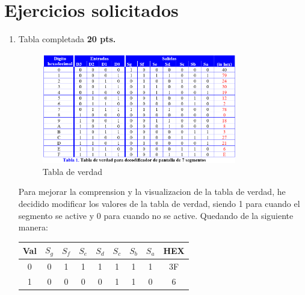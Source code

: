 \documentclass{templateNote}
\begin{document}

\portada
\margenes

\section*{Ejercicios solicitados}

\begin{enumerate}
    \item Tabla completada \textbf{20 pts.}
    \begin{figure}[H]
        \centering
        \includegraphics[width=0.8\textwidth]{img/tabla.png}
        \caption{Tabla de verdad}
        \label{fig:tabla}
    \end{figure}
    Para mejorar la comprension y la visualizacion de la tabla de verdad, he decidido modificar los valores de la tabla de verdad, siendo 1 para cuando el segmento se active y 0 para cuando no se active. Quedando de la siguiente manera:
    \begin{table}[H]
        \centering
        \begin{tabular}{|c|c|c|c|c|c|c|c|c|}
            \hline
            \textbf{Val} & \textbf{$S_g$} & \textbf{$S_f$} & \textbf{$S_e$} & \textbf{$S_d$} & \textbf{$S_c$} & \textbf{$S_b$} & \textbf{$S_a$} & \textbf{HEX} \\ \hline
            0            & 0              & 1              & 1              & 1              & 1              & 1              & 1              & 3F         \\ \hline
            1            & 0              & 0              & 0              & 0              & 1              & 1              & 0              & 6          \\ \hline

\end{tabular}
\end{table}
\end{enumerate}
\end{document}
